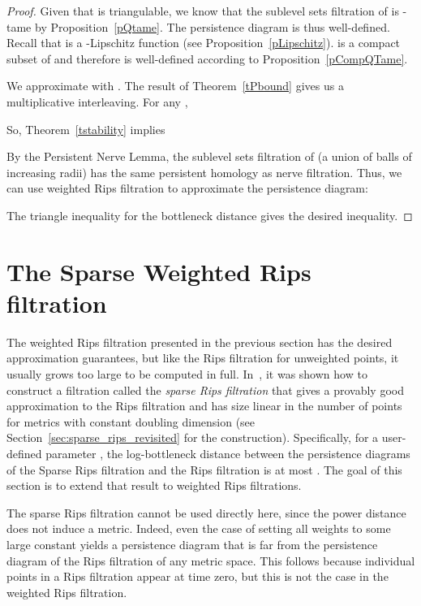 \documentclass[a4paper]{article}
\begin{document}
\begin{proof}
Given that  is triangulable, we know that the sublevel sets filtration of  is -tame by Proposition~\ref{pQtame}.
The persistence diagram  is thus well-defined.
Recall that  is a -Lipschitz function (see Proposition~\ref{pLipschitz}).
 is a compact subset of  and therefore  is well-defined according to Proposition~\ref{pCompQTame}.

We approximate  with . 
The result of Theorem~\ref{tPbound} gives us a  multiplicative interleaving.
For any ,

So, Theorem~\ref{tstability} implies


By the Persistent Nerve Lemma, the sublevel sets filtration of  (a union of balls of increasing radii) has the same persistent homology as nerve filtration.
Thus, we can use weighted Rips filtration to approximate the persistence diagram:


The triangle inequality for the bottleneck distance gives the desired inequality.
\end{proof}







\section{The Sparse Weighted Rips filtration} \label{sec:sparse_rips}

The weighted Rips filtration presented in the previous section has the desired approximation guarantees, but like the Rips filtration for unweighted points, it usually grows too large to be computed in full.
In~\cite{lsavrfS}, it was shown how to construct a filtration  called the \emph{sparse Rips filtration} that gives a provably good approximation to the Rips filtration and has size linear in the number of points for metrics with constant doubling dimension (see Section~\ref{sec:sparse_rips_revisited} for the construction).
Specifically, for a user-defined parameter , the log-bottleneck distance between the persistence diagrams of the Sparse Rips filtration and the Rips filtration is at most .
The goal of this section is to extend that result to weighted Rips filtrations.

The sparse Rips filtration cannot be used directly here, since the power distance does not induce a metric.
Indeed, even the case of setting all weights to some large constant yields a persistence diagram that is far from the persistence diagram of the Rips filtration of any metric space.
This follows because individual points in a Rips filtration appear at time zero, but this is not the case in the weighted Rips filtration.
\end{document}
